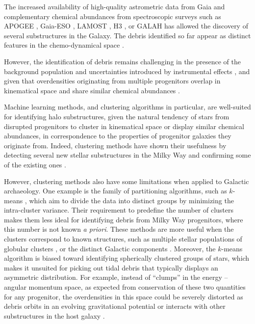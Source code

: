 The increased availability of high-quality astrometric data from Gaia \citep{GaiaCollaboration2016b,GaiaCollaboration2023b} and complementary chemical abundances from spectroscopic surveys such as APOGEE \citep{Majewski2017}, Gaia-ESO \citep{Gilmore2012,Randich2013}, LAMOST \citep{Zhao2012}, H3 \citep{Conroy2019}, or GALAH \citep{Buder2021,Buder2025} has allowed the discovery of several substructures in the Galaxy. The debris identified so far appear as distinct features in the chemo-dynamical space \citep[e.g.,][]{Klement2009,Helmi2018,Belokurov2018,Koppelman2019,Kruijssen2019b,Ji2020,Naidu2020,Horta2023,Malhan2024}.

However, the identification of debris remains challenging in the presence of the background population and uncertainties introduced by instrumental effects \citep{Brown2005}, and given that overdensities originating from multiple progenitors overlap in kinematical space and share similar chemical abundances \citep{JeanBaptiste2017,Orkney2023,Carrillo2024,Mori2024,Kizhuprakkat2024}. 

Machine learning methods, and clustering algorithms in particular, are well-suited for identifying halo substructures, given the natural tendency of stars from disrupted progenitors to cluster in kinematical space or display similar chemical abundances, in correspondence to the properties of progenitor galaxies they originate from. Indeed, clustering methods have shown their usefulness by detecting several new stellar substructures in the Milky Way and confirming some of the existing ones \citep[e.g.,][]{Koppelman2019,Myeong2019,Borsato2020,Necib2020b,ReFiorentin2015,RuizLara2022a,Yuan2020,Dodd2023,Kim2025}. 

However, clustering methods also have some limitations when applied to Galactic archaeology. One example is the family of partitioning algorithms, such as $k$-means \citep{MacQueen1967}, which aim to divide the data into distinct groups by minimizing the intra-cluster variance. Their requirement to predefine the number of clusters makes them less ideal for identifying debris from Milky Way progenitors, where this number is not known {\it a priori}. These methods are more useful when the clusters correspond to known structures, such as multiple stellar populations of globular clusters \citep{FraixBurnet2015}, or the distinct Galactic components \citep{Mackereth2019b}. Moreover, the $k$-means algorithm is biased toward identifying spherically clustered groups of stars, which makes it unsuited for picking out tidal debris that typically displays an asymmetric distribution. For example, instead of ``clumps'' in the energy -- angular momentum space,  as expected from conservation of these two quantities for any progenitor, the overdensities in this space could be severely distorted as debris orbits in an evolving gravitational potential or interacts with other substructures in the host galaxy \citep[e.g.,][]{Font2006a,Gomez2010,Gomez2013}.

